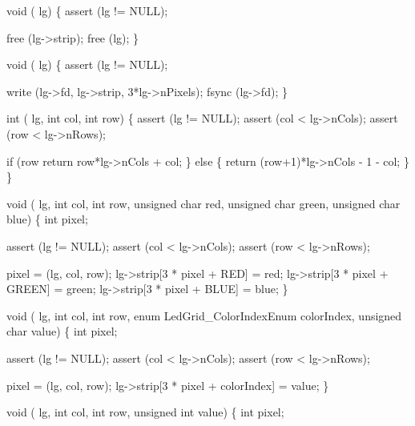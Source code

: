 \documentclass[abstracton,10pt]{scrartcl}%
\begin{document}
void  ( lg) \{
    assert (lg != NULL);

    free (lg->strip);
    free (lg);
\}

void  ( lg) \{
    assert (lg != NULL);

    write (lg->fd, lg->strip, 3*lg->nPixels);
    fsync (lg->fd);
\}

int  ( lg, int col, int row) \{
    assert (lg != NULL);
    assert (col < lg->nCols);
    assert (row < lg->nRows);

    if (row%
        return row*lg->nCols + col;
    \} else \{
        return (row+1)*lg->nCols - 1 - col;
    \}
\}

void  ( lg, int col, int row,
        unsigned char red, unsigned char green, unsigned char blue) \{
    int pixel;

    assert (lg != NULL);
    assert (col < lg->nCols);
    assert (row < lg->nRows);

    pixel =  (lg, col, row);
    lg->strip[3 * pixel + RED]   = red;
    lg->strip[3 * pixel + GREEN] = green;
    lg->strip[3 * pixel + BLUE]  = blue;
\}

void  ( lg, int col, int row,
        enum LedGrid_ColorIndexEnum colorIndex, unsigned char value) \{
    int pixel;

    assert (lg != NULL);
    assert (col < lg->nCols);
    assert (row < lg->nRows);

    pixel =  (lg, col, row);
    lg->strip[3 * pixel + colorIndex] = value;
\}

void  ( lg, int col, int row,
        unsigned int value) \{
    int pixel;
\end{document}

